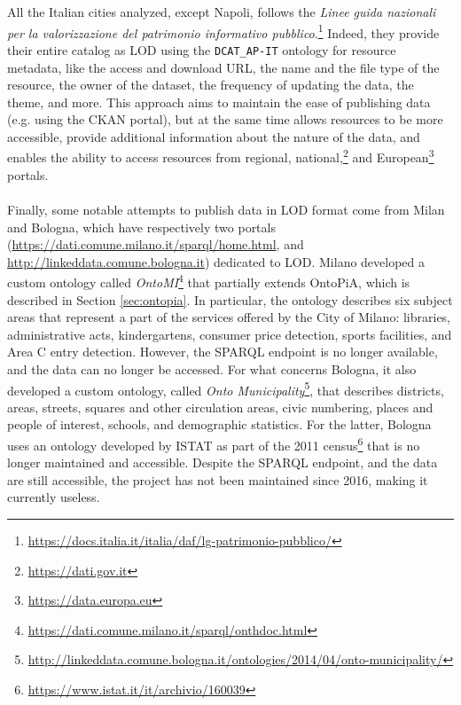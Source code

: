 All the Italian cities analyzed, except Napoli, follows the \textit{Linee guida nazionali per la valorizzazione del patrimonio informativo pubblico}.\footnote{\url{https://docs.italia.it/italia/daf/lg-patrimonio-pubblico/}} Indeed, they provide their entire catalog as \acl{LOD} using the \verb#DCAT_AP-IT# ontology for resource metadata, like the access and download \acs{URL}, the name and the file type of the resource, the owner of the dataset, the frequency of updating the data, the theme, and more. This approach aims to maintain the ease of publishing data (e.g. using the CKAN portal), but at the same time allows resources to be more accessible, provide additional information about the nature of the data, and enables the ability to access resources from regional, national,\footnote{\url{https://dati.gov.it}} and European\footnote{\url{https://data.europa.eu}} portals.

\paragraph*{}
Finally, some notable attempts to publish data in \acl{LOD} format come from Milan and Bologna, which have respectively two portals (\url{https://dati.comune.milano.it/sparql/home.html}, and \url{http://linkeddata.comune.bologna.it}) dedicated to \acl{LOD}. Milano developed a custom ontology called \textit{OntoMI}\footnote{\url{https://dati.comune.milano.it/sparql/onthdoc.html}} that partially extends OntoPiA, which is described in Section \ref{sec:ontopia}. In particular, the ontology describes six subject areas that represent a part of the services offered by the City of Milano: libraries, administrative acts, kindergartens, consumer price detection, sports facilities, and Area C entry detection. However, the \ac{SPARQL} endpoint is no longer available, and the data can no longer be accessed. For what concerns Bologna, it also developed a custom ontology, called \textit{Onto Municipality}\footnote{\url{http://linkeddata.comune.bologna.it/ontologies/2014/04/onto-municipality/}}, that describes districts, areas, streets, squares and other circulation areas, civic numbering, places and people of interest, schools, and demographic statistics. For the latter, Bologna uses an ontology developed by ISTAT as part of the 2011 census\footnote{\url{https://www.istat.it/it/archivio/160039}} that is no longer maintained and accessible. Despite the \ac{SPARQL} endpoint, and the data are still accessible, the project has not been maintained since 2016, making it currently useless.